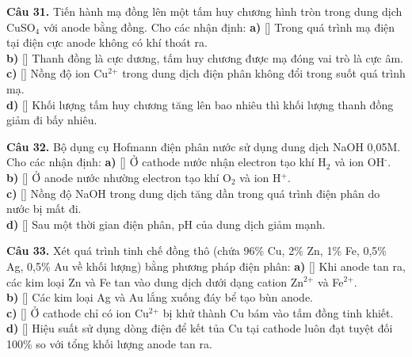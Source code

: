 \documentclass{article}
\begin{document}
\fontsize{22}{29}\selectfont
\textbf{Câu 31.} Tiến hành mạ đồng lên một tấm huy chương hình tròn trong dung dịch CuSO$_{\text{4}}$ với anode bằng đồng. Cho các nhận định:
\vspace{6pt}
\textbf{a)} [\quad] Trong quá trình mạ điện tại điện cực anode không có khí thoát ra.\\[4pt]
\textbf{b)} [\quad] Thanh đồng là cực dương, tấm huy chương được mạ đóng vai trò là cực âm.\\[4pt]
\textbf{c)} [\quad] Nồng độ ion Cu$^{\text{2+}}$ trong dung dịch điện phân không đổi trong suốt quá trình mạ.\\[4pt]
\textbf{d)} [\quad] Khối lượng tấm huy chương tăng lên bao nhiêu thì khối lượng thanh đồng giảm đi bấy nhiêu.\\[4pt]
\vspace*{\fill}
\newpage

\fontsize{22}{29}\selectfont
\textbf{Câu 32.} Bộ dụng cụ Hofmann điện phân nước sử dụng dung dịch NaOH 0,05M. Cho các nhận định:
\vspace{6pt}
\textbf{a)} [\quad] Ở cathode nước nhận electron tạo khí H$_{\text{2}}$ và ion OH$^{\text{-}}$.\\[4pt]
\textbf{b)} [\quad] Ở anode nước nhường electron tạo khí O$_{\text{2}}$ và ion H$^{\text{+}}$.\\[4pt]
\textbf{c)} [\quad] Nồng độ NaOH trong dung dịch tăng dần trong quá trình điện phân do nước bị mất đi.\\[4pt]
\textbf{d)} [\quad] Sau một thời gian điện phân, pH của dung dịch giảm mạnh.\\[4pt]
\vspace*{\fill}
\newpage

\fontsize{22}{29}\selectfont
\textbf{Câu 33.} Xét quá trình tinh chế đồng thô (chứa 96\% Cu, 2\% Zn, 1\% Fe, 0,5\% Ag, 0,5\% Au về khối lượng) bằng phương pháp điện phân:
\vspace{6pt}
\textbf{a)} [\quad] Khi anode tan ra, các kim loại Zn và Fe tan vào dung dịch dưới dạng cation Zn$^{\text{2+}}$ và Fe$^{\text{2+}}$.\\[4pt]
\textbf{b)} [\quad] Các kim loại Ag và Au lắng xuống đáy bể tạo bùn anode.\\[4pt]
\textbf{c)} [\quad] Ở cathode chỉ có ion Cu$^{\text{2+}}$ bị khử thành Cu bám vào tấm đồng tinh khiết.\\[4pt]
\textbf{d)} [\quad] Hiệu suất sử dụng dòng điện để kết tủa Cu tại cathode luôn đạt tuyệt đối 100\% so với tổng khối lượng anode tan ra.\\[4pt]
\vspace*{\fill}
\newpage
\end{document}
